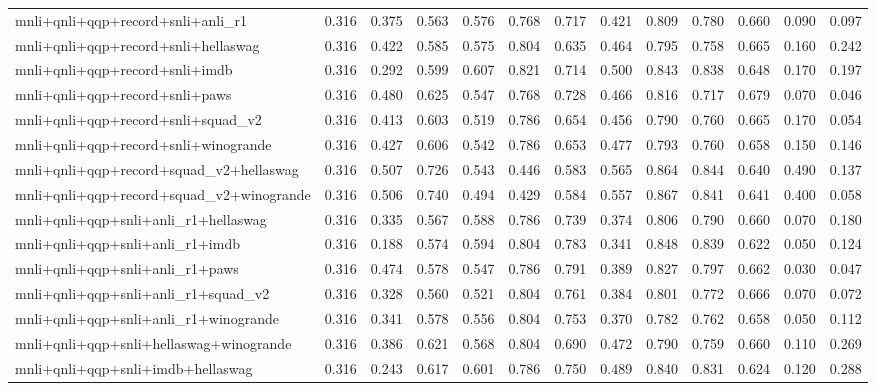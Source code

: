 \begin{table}[t]
\begin{tabular}{lrrrrrrrrrrrr}
    mnli+qnli+qqp+record+snli+anli\_r1 & 0.316 & 0.375 & 0.563 & 0.576 & 0.768 & 0.717 & 0.421 & 0.809 & 0.780 & 0.660 & 0.090 & 0.097 \\
    mnli+qnli+qqp+record+snli+hellaswag & 0.316 & 0.422 & 0.585 & 0.575 & 0.804 & 0.635 & 0.464 & 0.795 & 0.758 & 0.665 & 0.160 & 0.242 \\
    mnli+qnli+qqp+record+snli+imdb & 0.316 & 0.292 & 0.599 & 0.607 & 0.821 & 0.714 & 0.500 & 0.843 & 0.838 & 0.648 & 0.170 & 0.197 \\
    mnli+qnli+qqp+record+snli+paws & 0.316 & 0.480 & 0.625 & 0.547 & 0.768 & 0.728 & 0.466 & 0.816 & 0.717 & 0.679 & 0.070 & 0.046 \\
    mnli+qnli+qqp+record+snli+squad\_v2 & 0.316 & 0.413 & 0.603 & 0.519 & 0.786 & 0.654 & 0.456 & 0.790 & 0.760 & 0.665 & 0.170 & 0.054 \\
    mnli+qnli+qqp+record+snli+winogrande & 0.316 & 0.427 & 0.606 & 0.542 & 0.786 & 0.653 & 0.477 & 0.793 & 0.760 & 0.658 & 0.150 & 0.146 \\
    mnli+qnli+qqp+record+squad\_v2+hellaswag & 0.316 & 0.507 & 0.726 & 0.543 & 0.446 & 0.583 & 0.565 & 0.864 & 0.844 & 0.640 & 0.490 & 0.137 \\
    mnli+qnli+qqp+record+squad\_v2+winogrande & 0.316 & 0.506 & 0.740 & 0.494 & 0.429 & 0.584 & 0.557 & 0.867 & 0.841 & 0.641 & 0.400 & 0.058 \\
    mnli+qnli+qqp+snli+anli\_r1+hellaswag & 0.316 & 0.335 & 0.567 & 0.588 & 0.786 & 0.739 & 0.374 & 0.806 & 0.790 & 0.660 & 0.070 & 0.180 \\
    mnli+qnli+qqp+snli+anli\_r1+imdb & 0.316 & 0.188 & 0.574 & 0.594 & 0.804 & 0.783 & 0.341 & 0.848 & 0.839 & 0.622 & 0.050 & 0.124 \\
    mnli+qnli+qqp+snli+anli\_r1+paws & 0.316 & 0.474 & 0.578 & 0.547 & 0.786 & 0.791 & 0.389 & 0.827 & 0.797 & 0.662 & 0.030 & 0.047 \\
    mnli+qnli+qqp+snli+anli\_r1+squad\_v2 & 0.316 & 0.328 & 0.560 & 0.521 & 0.804 & 0.761 & 0.384 & 0.801 & 0.772 & 0.666 & 0.070 & 0.072 \\
    mnli+qnli+qqp+snli+anli\_r1+winogrande & 0.316 & 0.341 & 0.578 & 0.556 & 0.804 & 0.753 & 0.370 & 0.782 & 0.762 & 0.658 & 0.050 & 0.112 \\
    mnli+qnli+qqp+snli+hellaswag+winogrande & 0.316 & 0.386 & 0.621 & 0.568 & 0.804 & 0.690 & 0.472 & 0.790 & 0.759 & 0.660 & 0.110 & 0.269 \\
    mnli+qnli+qqp+snli+imdb+hellaswag & 0.316 & 0.243 & 0.617 & 0.601 & 0.786 & 0.750 & 0.489 & 0.840 & 0.831 & 0.624 & 0.120 & 0.288 \\

\end{tabular}
\end{table}
